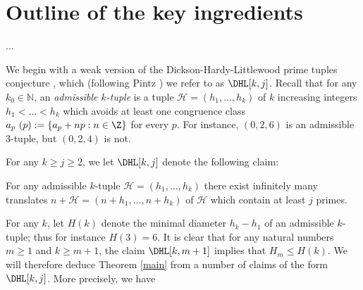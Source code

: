 \section{Outline of the key ingredients}\label{subclaim-sec}

...

We begin with a weak version of the Dickson-Hardy-Littlewood prime tuples conjecture \cite{hardy}, which (following Pintz \cite{pintz-polignac}) we refer to as $\DHL[k,j]$.  Recall that for any $k_0 \in \mathbb{N}$, an \emph{admissible $k$-tuple} is a tuple ${\mathcal H} = (h_1,\ldots,h_{k})$ of $k$ increasing integers $h_1 < \ldots < h_{k}$ which avoids at least one congruence class $a_p\ (p) := \{ a_p + np: n \in \Z \}$ for every $p$.  For instance, $(0,2,6)$ is an admissible $3$-tuple, but $(0,2,4)$ is not.

For any $k \geq j \geq 2$, we let $\DHL[k,j]$ denote the following claim:

\begin{claim} For any admissible $k$-tuple ${\mathcal
    H}=(h_1,\ldots,h_{k})$ there
  exist infinitely many translates $n + {\mathcal H} =
  (n+h_1,\ldots,n+h_{k})$ of ${\mathcal H}$ which contain at least $j$
  primes.
\end{claim}

For any $k$, let $H(k)$ denote the minimal diameter $h_k-h_1$ of an admissible $k$-tuple; thus for instance $H(3)=6$.  It is clear that for any natural numbers $m \geq 1$ and $k \geq m+1$, the claim $\DHL[k,m+1]$ implies that $H_m \leq H(k)$.  We will therefore deduce Theorem \ref{main} from a number of claims of the form $\DHL[k,j]$.  More precisely, we have

